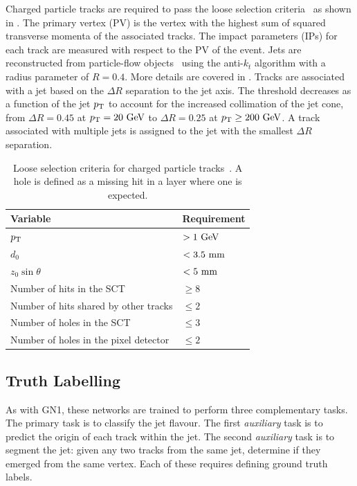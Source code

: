 Charged particle tracks are required to pass the loose selection criteria~\cite{DL1D} as shown in .
The primary vertex (PV) is the vertex with the highest sum of squared transverse momenta of the associated tracks.
The impact parameters (IPs) for each track are measured with respect to the PV of the event.
Jets are reconstructed from particle-flow objects~\cite{PFlow} using the anti-$k_t$ algorithm with a radius parameter of $R = 0.4$.
More details are covered in .
Tracks are associated with a jet based on the $\Delta R$ separation to the jet axis.
The threshold decreases as a function of the jet $p_{\text{T}}$ to account for the increased collimation of the jet cone, from $\Delta R = 0.45$ at $\pt = 20~\GeV$ to $\Delta R = 0.25$ at $\pt \geq 200~\GeV$.
A track associated with multiple jets is assigned to the jet with the smallest $\Delta R$ separation.

\begin{table}
    \centering
    \begin{tabular}{ll}
        \toprule
        Variable & Requirement \\
        \midrule
        $p_{\text{T}}$ & $> 1~\GeV$ \\
        $d_0$ & $< 3.5~\mm$ \\
        $z_0 \sin \theta$ & $< 5~\mm$ \\
        Number of hits in the SCT & $\geq 8$ \\
        Number of hits shared by other tracks & $\leq 2$ \\
        Number of holes in the SCT & $\leq 3$ \\
        Number of holes in the pixel detector & $\leq 2$ \\
        \bottomrule
    \end{tabular}
    \caption{Loose selection criteria for charged particle tracks~\cite{DL1D}. A hole is defined as a missing hit in a layer where one is expected.}
    \label{tab:track_loose}
\end{table}

\subsection{Truth Labelling}

As with GN1, these networks are trained to perform three complementary tasks.
The primary task is to classify the jet flavour.
The first \textit{auxiliary} task is to predict the origin of each track within the jet. The second \textit{auxiliary} task is to segment the jet: given any two tracks from the same jet, determine if they emerged from the same vertex. Each of these requires defining ground truth labels.

